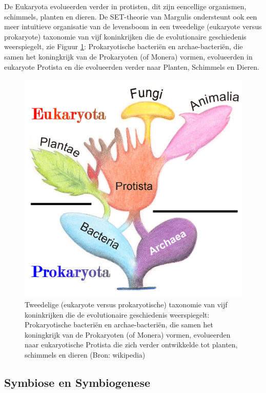 \documentclass[
  11pt,
]{book}
\begin{document}
De Eukaryota evolueerden verder in protisten, dit zijn eencellige organismen, schimmels, planten en dieren. De SET-theorie van Margulis ondersteunt ook een meer intuïtieve organisatie van de levensboom in een tweedelige (eukaryote versus prokaryote) taxonomie van vijf koninkrijken die de evolutionaire geschiedenis weerspiegelt, zie Figuur \ref{fig:fiveKingdoms}: Prokaryotische bacteriën en archae-bacteriën, die samen het koningkrijk van de Prokaryoten (of Monera) vormen, evolueerden in eukaryote Protista en die evolueerden verder naar Planten, Schimmels en Dieren.

\begin{figure}

{\centering \includegraphics[width=0.8\linewidth]{./figs/fiveKingdoms} 

}

\caption{Tweedelige (eukaryote versus prokaryotische) taxonomie van vijf koninkrijken die de evolutionaire geschiedenis weerspiegelt: Prokaryotische bacteriën en archae-bacteriën, die samen het koningkrijk van de Prokaryoten (of Monera) vormen, evolueerden naar eukaryotische Protista die zich verder ontwikkelde tot planten, schimmels en dieren (Bron: wikipedia)}\label{fig:fiveKingdoms}
\end{figure}

\hypertarget{symbiose-en-symbiogenese}{%
\subsection{Symbiose en Symbiogenese}\label{symbiose-en-symbiogenese}}
\end{document}
